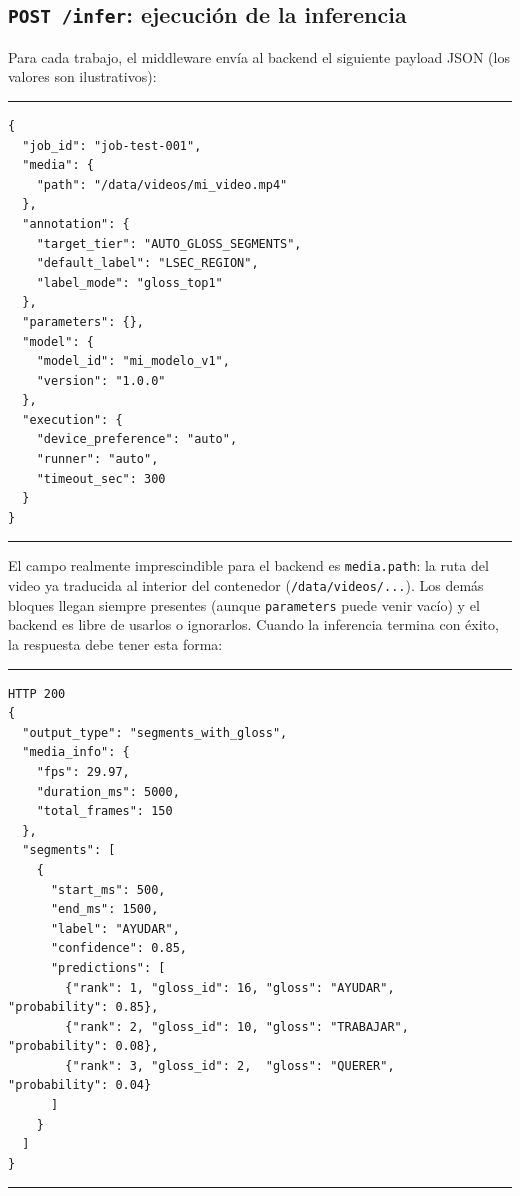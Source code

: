 \documentclass[12pt,a4paper]{article}
\begin{document}
\subsection{\texttt{POST /infer}: ejecución de la inferencia}

Para cada trabajo, el middleware envía al backend el siguiente payload JSON (los valores son ilustrativos):

\begin{center}
\begin{minipage}{0.92\textwidth}
\hrule
\vspace{0.06cm}
\footnotesize
\begin{Verbatim}[baselinestretch=0.8]
{
  "job_id": "job-test-001",
  "media": {
    "path": "/data/videos/mi_video.mp4"
  },
  "annotation": {
    "target_tier": "AUTO_GLOSS_SEGMENTS",
    "default_label": "LSEC_REGION",
    "label_mode": "gloss_top1"
  },
  "parameters": {},
  "model": {
    "model_id": "mi_modelo_v1",
    "version": "1.0.0"
  },
  "execution": {
    "device_preference": "auto",
    "runner": "auto",
    "timeout_sec": 300
  }
}
\end{Verbatim}
\vspace{0.03cm}
\hrule
{}
\end{minipage}
\end{center}

El campo realmente imprescindible para el backend es \texttt{media.path}: la ruta del video ya traducida al interior del contenedor (\texttt{/data/videos/...}). Los demás bloques llegan siempre presentes (aunque \texttt{parameters} puede venir vacío) y el backend es libre de usarlos o ignorarlos. Cuando la inferencia termina con éxito, la respuesta debe tener esta forma:

\begin{center}
\begin{minipage}{0.92\textwidth}
\hrule
\vspace{0.06cm}
\footnotesize
\begin{Verbatim}[baselinestretch=0.75]
HTTP 200
{
  "output_type": "segments_with_gloss",
  "media_info": {
    "fps": 29.97,
    "duration_ms": 5000,
    "total_frames": 150
  },
  "segments": [
    {
      "start_ms": 500,
      "end_ms": 1500,
      "label": "AYUDAR",
      "confidence": 0.85,
      "predictions": [
        {"rank": 1, "gloss_id": 16, "gloss": "AYUDAR",   "probability": 0.85},
        {"rank": 2, "gloss_id": 10, "gloss": "TRABAJAR", "probability": 0.08},
        {"rank": 3, "gloss_id": 2,  "gloss": "QUERER",   "probability": 0.04}
      ]
    }
  ]
}
\end{Verbatim}
\vspace{0.03cm}
\hrule
{}
\end{minipage}
\end{center}
\end{document}
